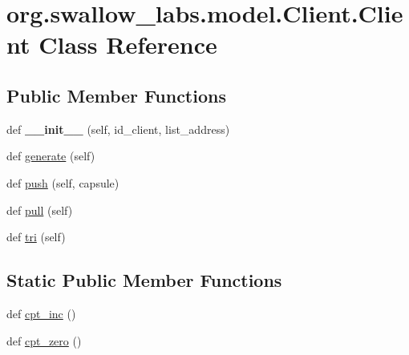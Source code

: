 \hypertarget{classorg_1_1swallow__labs_1_1model_1_1_client_1_1_client}{}\section{org.\+swallow\+\_\+labs.\+model.\+Client.\+Client Class Reference}
\label{classorg_1_1swallow__labs_1_1model_1_1_client_1_1_client}
\subsection*{Public Member Functions}
\begin{DoxyCompactItemize}
\item 
\hypertarget{classorg_1_1swallow__labs_1_1model_1_1_client_1_1_client_a32d08f7e8b396505b030e4096c6bcb7a}{}def {\bfseries \+\_\+\+\_\+init\+\_\+\+\_\+} (self, id\+\_\+client, list\+\_\+address)\label{classorg_1_1swallow__labs_1_1model_1_1_client_1_1_client_a32d08f7e8b396505b030e4096c6bcb7a}

\item 
def \hyperlink{classorg_1_1swallow__labs_1_1model_1_1_client_1_1_client_ac570a7d1159d134dda563b8c179e286d}{generate} (self)
\item 
def \hyperlink{classorg_1_1swallow__labs_1_1model_1_1_client_1_1_client_a12029308b8d9657bad4fc9643762b9c4}{push} (self, capsule)
\item 
def \hyperlink{classorg_1_1swallow__labs_1_1model_1_1_client_1_1_client_a3e974020d69fc45eb0f2394bd6d20332}{pull} (self)
\item 
def \hyperlink{classorg_1_1swallow__labs_1_1model_1_1_client_1_1_client_ac6bb2cd98728fc272ed85fe0a1a0db6f}{tri} (self)
\end{DoxyCompactItemize}
\subsection*{Static Public Member Functions}
\begin{DoxyCompactItemize}
\item 
def \hyperlink{classorg_1_1swallow__labs_1_1model_1_1_client_1_1_client_acb2a21796e9bd6c23b8e2b05ba82e9fe}{cpt\+\_\+inc} ()
\item 
def \hyperlink{classorg_1_1swallow__labs_1_1model_1_1_client_1_1_client_a500552223dc705c740e15e8b3da46e4f}{cpt\+\_\+zero} ()
\end{DoxyCompactItemize}
